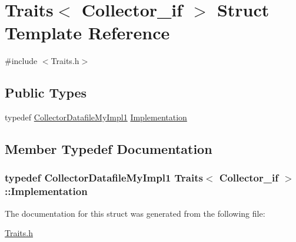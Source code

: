 \hypertarget{struct_traits_3_01_collector__if_01_4}{\section{Traits$<$ Collector\-\_\-if $>$ Struct Template Reference}
\label{struct_traits_3_01_collector__if_01_4}
}


{\ttfamily \#include $<$Traits.\-h$>$}

\subsection*{Public Types}
\begin{DoxyCompactItemize}
\item 
typedef \hyperlink{class_collector_datafile_my_impl1}{Collector\-Datafile\-My\-Impl1} \hyperlink{struct_traits_3_01_collector__if_01_4_a1d9580805be9a661541a69cbf3a947da}{Implementation}
\end{DoxyCompactItemize}


\subsection{Member Typedef Documentation}
\hypertarget{struct_traits_3_01_collector__if_01_4_a1d9580805be9a661541a69cbf3a947da}{
\subsubsection[{Implementation}]{\setlength{\rightskip}{0pt plus 5cm}typedef {\bf Collector\-Datafile\-My\-Impl1} {\bf Traits}$<$ {\bf Collector\-\_\-if} $>$\-::{\bf Implementation}}}\label{struct_traits_3_01_collector__if_01_4_a1d9580805be9a661541a69cbf3a947da}


The documentation for this struct was generated from the following file\-:\begin{DoxyCompactItemize}
\item 
\hyperlink{_traits_8h}{Traits.\-h}\end{DoxyCompactItemize}
